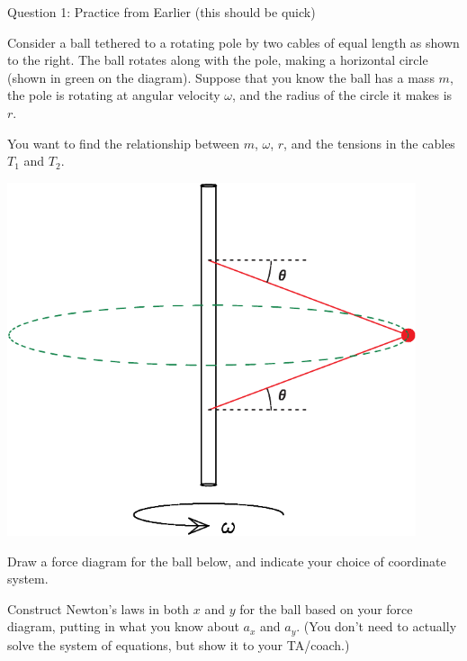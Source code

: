 \documentclass[12pt]{article}
\begin{document}
\Large
\centerline{}
\normalsize
\centerline{}

\medskip
\centerline{\Large Question 1: Practice from Earlier (this should be quick)}

\begin{minipage}{0.5\textwidth}
	Consider a ball tethered to a rotating pole by two cables of equal length as shown to the right. The ball rotates along with the pole, making a horizontal circle (shown in green on the diagram). Suppose that you know the ball has a mass $m$, the pole is rotating at angular velocity $\omega$, and the radius of the circle it makes is $r$.
	
	\bigskip
	
	You want to find the relationship between $m$, $\omega$, $r$, and the tensions in the cables $T_1$ and $T_2$.
	
\end{minipage}
\begin{minipage}{0.4\textwidth}
	\hspace{0.1\textwidth}
	\includegraphics[width=0.9\textwidth]{pole-crop.pdf}
\end{minipage}

Draw a force diagram for the ball below, and indicate your choice of coordinate system.
%

\vspace{3in}

Construct Newton's laws in both $x$ and $y$ for the ball based on your force diagram, putting in what you know about $a_x$ and $a_y$. (You don't need to actually solve the system of equations, but show it to your TA/coach.)
%
%
%
\end{document}
